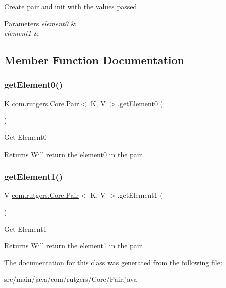 Create pair and init with the values passed 
\begin{DoxyParams}{Parameters}
{\em element0} & \\
\hline
{\em element1} & \\
\hline
\end{DoxyParams}


\subsection{Member Function Documentation}
\mbox{\label{classcom_1_1rutgers_1_1Core_1_1Pair_aa1ee0d8fa231e29cbc7a7d3ad64738c2}} 
\subsubsection{\texorpdfstring{get\+Element0()}{getElement0()}}
{\footnotesize\ttfamily K \hyperlink{classcom_1_1rutgers_1_1Core_1_1Pair}{com.\+rutgers.\+Core.\+Pair}$<$ K, V $>$.get\+Element0 (\begin{DoxyParamCaption}{ }\end{DoxyParamCaption})}

Get Element0 \begin{DoxyReturn}{Returns}
Will return the element0 in the pair. 
\end{DoxyReturn}
\mbox{\label{classcom_1_1rutgers_1_1Core_1_1Pair_a4815bd5515106b5d9fb2113f94b184d2}} 
\subsubsection{\texorpdfstring{get\+Element1()}{getElement1()}}
{\footnotesize\ttfamily V \hyperlink{classcom_1_1rutgers_1_1Core_1_1Pair}{com.\+rutgers.\+Core.\+Pair}$<$ K, V $>$.get\+Element1 (\begin{DoxyParamCaption}{ }\end{DoxyParamCaption})}

Get Element1 \begin{DoxyReturn}{Returns}
Will return the element1 in the pair. 
\end{DoxyReturn}


The documentation for this class was generated from the following file\+:\begin{DoxyCompactItemize}
\item 
src/main/java/com/rutgers/\+Core/Pair.\+java\end{DoxyCompactItemize}
